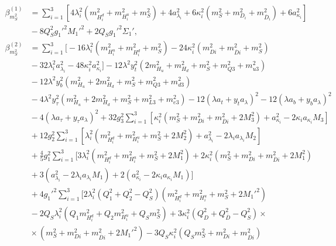 \documentclass[preprint,amsmath,amssymb,aps,superscriptaddress,prd,showpacs,floatfix,nofootinbib]{revtex4-1}
\begin{document}
\begin{subequations}
\begin{align}
\beta_{m_S^2}^{(1)}&=\sum_{i=1}^3\left [ 4\lambda_i^2\left ( m_{H_i^d}^2+m_{H_i^u}^2+m_S^2\right )+4a_{\lambda_i}^2+6\kappa_i^2\left ( m_S^2+m_{D_i}^2+m_{\overline{D}_i}^2\right )+6a_{\kappa_i}^2\right ]\nonumber\\
&{}-8Q_S^2g_1'^2M_1'^2+2Q_Sg_1'^2\Sigma_1',\label{eq:USSMms2BetaOneLoop}\\
\beta_{m_S^2}^{(2)}&=\sum_{i=1}^3\bigg [ -16\lambda_i^2\left ( m_{H_i^u}^2+m_{H_i^d}^2+m_S^2 \right )-24\kappa_i^2\left ( m_{Di}^2+m_{\overline{D}i}^2+m_S^2 \right )\nonumber\\
&{}-32\lambda_i^2a_{\lambda_i}^2-48\kappa_i^2a_{\kappa_i}^2\bigg ]-12\lambda^2y_t^2\left ( 2m_{H_u}^2+m_{H_d}^2+m_S^2+m_{Q3}^2+m_{u3}^2\right )\nonumber\\
&{}-12\lambda^2y_b^2\left ( m_{H_u}^2+2m_{H_d}^2+m_S^2+m_{Q3}^2+m_{d3}^2\right )\nonumber\\
&{}-4\lambda^2y_\tau^2\left ( m_{H_u}^2+2m_{H_d}^2+m_S^2+m_{L3}^2+m_{e3}^2\right )-12\left ( \lambda a_t+y_ta_\lambda\right )^2-12\left ( \lambda a_b+y_ba_\lambda\right )^2\nonumber\\
&{}-4\left ( \lambda a_\tau+y_\tau a_\lambda\right )^2+32g_3^2\sum_{i=1}^3\left [ \kappa_i^2\left ( m_S^2+m_{Di}^2+m_{\overline{D}i}^2+2M_3^2\right )+a_{\kappa_i}^2-2\kappa_ia_{\kappa_i}M_3 \right ]\nonumber\\
&{}+12g_2^2\sum_{i=1}^3\left [ \lambda_i^2\left ( m_{H_i^d}^2+m_{H_i^u}^2+m_S^2+2M_2^2\right )+a_{\lambda_i}^2-2\lambda_ia_{\lambda_i}M_2\right ]\nonumber\\
&{}+\frac{4}{5}g_1^2\sum_{i=1}^3\bigg [ 3\lambda_i^2\left ( m_{H_i^d}^2+m_{H_i^u}^2+m_S^2+2M_1^2\right )+2\kappa_i^2\left ( m_S^2+m_{Di}^2+m_{\overline{D}i}^2+2M_1^2\right )\nonumber\\
&{}+3\left (a_{\lambda_i}^2-2\lambda_ia_{\lambda_i}M_1\right )+2\left (a_{\kappa_i}^2-2\kappa_ia_{\kappa_i}M_1\right )\bigg ]\nonumber\\
&{}+4g_1'^2\sum_{i=1}^3\bigg [ 2\lambda_i^2\left ( Q_1^2+Q_2^2-Q_S^2\right )\left ( m_{H_i^d}^2+m_{H_i^u}^2+m_S^2+2M_1'^2\right )\nonumber\\
&{}-2Q_S\lambda_i^2\left ( Q_1m_{H_i^d}^2+Q_2m_{H_i^u}^2+Q_Sm_S^2\right )+3\kappa_i^2\left ( Q_D^2+Q_{\overline{D}}^2-Q_S^2\right )\times\nonumber\\
&{}\times\left ( m_S^2+m_{Di}^2+m_{\overline{D}i}^2+2M_1'^2\right )-3Q_S\kappa_i^2\left ( Q_Sm_S^2+m_{Di}^2+m_{\overline{D}i}^2\right )\nonumber\\

\end{align}
\end{subequations}
\end{document}
